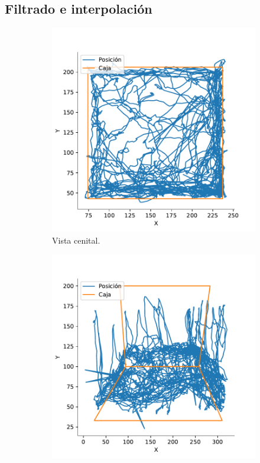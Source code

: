 \subsection{Filtrado e interpolación}

\begin{figure}[H]
  \centering
  \begin{subfigure}{0.45\textwidth}
    \centering
    \includegraphics[width=\textwidth]{figures/raw-trayectory-top-4128-2020-12-02.pdf}
    \caption{Vista cenital.}
  \end{subfigure}
  \begin{subfigure}{0.45\textwidth}
    \centering
    \includegraphics[width=\textwidth]{figures/raw-trayectory-lateral-4128-2020-12-02.pdf}

\end{subfigure}
\end{figure}
